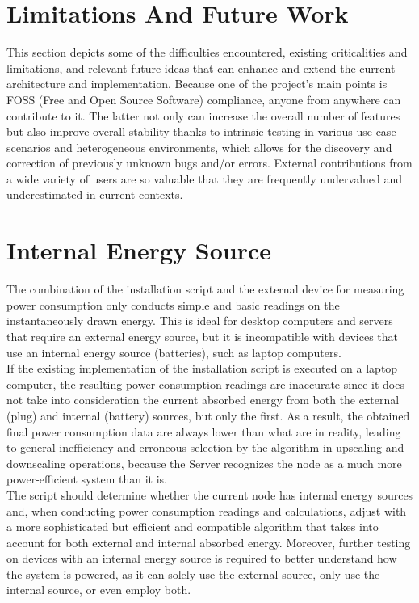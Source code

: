 \section{Limitations And Future Work}
\label{sec:conclusions_limitations_and_future_works}

This section depicts some of the difficulties encountered, existing criticalities
and limitations, and relevant future ideas that can enhance and extend the
current architecture and implementation. Because one of the project's main points
is FOSS (Free and Open Source Software) compliance, anyone from anywhere can
contribute to it. The latter not only can increase the overall number of features
but also improve overall stability thanks to intrinsic testing in various use-case
scenarios and heterogeneous environments, which allows for the discovery and
correction of previously unknown bugs and/or errors. External contributions from
a wide variety of users are so valuable that they are frequently undervalued and
underestimated in current contexts. \\ %

\section{Internal Energy Source}
\label{subsec:conclusions_limitations_and_future_works_internal_energy_source}

The combination of the installation script and the external device for measuring
power consumption only conducts simple and basic readings on the instantaneously
drawn energy. This is ideal for desktop computers and servers that require an
external energy source, but it is incompatible with devices that use an internal
energy source (batteries), such as laptop computers. \\ %
If the existing implementation of the installation script is executed on a
laptop computer, the resulting power consumption readings are inaccurate since it
does not take into consideration the current absorbed energy from both the external
(plug) and internal (battery) sources, but only the first. As a result, the
obtained final power consumption data are always lower than what are in reality,
leading to general inefficiency and erroneous selection by the algorithm in upscaling
and downscaling operations, because the Server recognizes the node as a much
more power-efficient system than it is. \\ %
The script should determine whether the current node has internal energy sources
and, when conducting power consumption readings and calculations, adjust with a
more sophisticated but efficient and compatible algorithm that takes into
account for both external and internal absorbed energy. Moreover, further
testing on devices with an internal energy source is required to better
understand how the system is powered, as it can solely use the external source,
only use the internal source, or even employ both.

